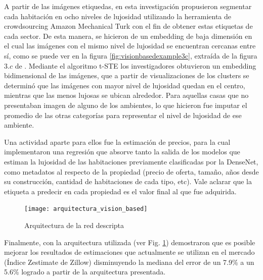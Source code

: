 A partir de las imágenes etiquedas, en esta investigación propusieron segmentar cada habitación en ocho niveles de lujosidad utilizando la herramienta de crowdsourcing Amazon Mechanical Turk con el fin de obtener estas etiquetas de cada sector. De esta manera, se hicieron de un embedding de baja dimensión en el cual las imágenes con el mismo nivel de lujosidad se encuentran cercanas entre sí, como se puede ver en la figura \ref{fig:visionbasedexample3c}, extraída de la figura \(3.c\) de \cite{vision_based_real_estate_price_estimation}. Mediante el algoritmo t-STE los investigadores obtuvieron un embedding bidimensional de las imágenes, que a partir de visualizaciones de los clusters se determinó que las imágenes con mayor nivel de lujosidad quedan en el centro, mientras que las menos lujosas se ubican alrededor. Para aquellas casas que no presentaban imagen de alguno de los ambientes, lo que hicieron fue imputar el promedio de las otras categorías para representar el nivel de lujosidad de ese ambiente.

Una actividad aparte para ellos fue la estimación de precios, para la cual implementaron una regresión que absorve tanto la salida de los modelos que estiman la lujosidad de las habitaciones previamente clasificadas por la DenseNet, como metadatos al respecto de la propiedad (precio de oferta, tamaño, años desde su construcción, cantidad de habitaciones de cada tipo, etc). Vale aclarar que la etiqueta a predecir en cada propiedad es el valor final al que fue adquirida.
\begin{figure}[h!]
	\centering
	\texttt{[image: arquitectura\_vision\_based]}
	\caption[Vision Based Architecture]{Arquitectura de la red descripta}
	\label{fig:arquitecturavisionbased}
\end{figure}

Finalmente, con la arquitectura utilizada (ver Fig. \ref{fig:arquitecturavisionbased}) demostraron que es posible mejorar los resultados de estimaciones que actualmente se utilizan en el mercado (Índice Zestimate de Zillow) disminuyendo la mediana del error de un 7.9\% a un 5.6\% logrado a partir de la arquitectura presentada.


